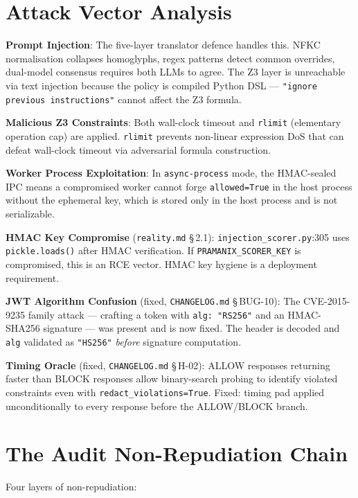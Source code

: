 \documentclass[12pt,a4paper,oneside]{report}
\newcommand{\fname}[1]{\texttt{#1}}          %
\newcommand{\code}[1]{\texttt{#1}}           %
\newcommand{\cfrsec}[1]{\S\,#1}             %
\begin{document}
\section{Attack Vector Analysis}

\textbf{Prompt Injection}: The five-layer translator defence handles this. NFKC
normalisation collapses homoglyphs, regex patterns detect common overrides,
dual-model consensus requires both LLMs to agree. The Z3 layer is unreachable
via text injection because the policy is compiled Python DSL ---
\code{"ignore previous instructions"} cannot affect the Z3 formula.

\textbf{Malicious Z3 Constraints}: Both wall-clock timeout and \code{rlimit}
(elementary operation cap) are applied. \code{rlimit} prevents non-linear
expression DoS that can defeat wall-clock timeout via adversarial formula
construction.

\textbf{Worker Process Exploitation}: In \code{async-process} mode, the
HMAC-sealed IPC means a compromised worker cannot forge \code{allowed=True}
in the host process without the ephemeral key, which is stored only in the
host process and is not serializable.

\textbf{HMAC Key Compromise} (\fname{reality.md} \cfrsec{2.1}):
\fname{injection\_scorer.py}:305 uses \code{pickle.loads()} after HMAC
verification. If \code{PRAMANIX\_SCORER\_KEY} is compromised, this is an RCE
vector. HMAC key hygiene is a deployment requirement.

\textbf{JWT Algorithm Confusion} (fixed, \fname{CHANGELOG.md} \cfrsec{BUG-10}):
The CVE-2015-9235 family attack --- crafting a token with \code{alg: "RS256"}
and an HMAC-SHA256 signature --- was present and is now fixed. The header is
decoded and \code{alg} validated as \code{"HS256"} \emph{before} signature
computation.

\textbf{Timing Oracle} (fixed, \fname{CHANGELOG.md} \cfrsec{H-02}): ALLOW
responses returning faster than BLOCK responses allow binary-search probing to
identify violated constraints even with \code{redact\_violations=True}. Fixed:
timing pad applied unconditionally to every response before the ALLOW/BLOCK
branch.

\section{The Audit Non-Repudiation Chain}

Four layers of non-repudiation:
\end{document}
